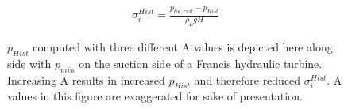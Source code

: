 \begin{eqnarray}
		\sigma_i^{Hist}=\frac{p_{tot,exit}-p_{Hist}}{\rho_{L}gH}
\label{Cavi7}
\end{eqnarray}


\begin{figure}[h!]
\begin{minipage}[b]{1\linewidth}
 \centering
\end{minipage}
\caption{$p_{Hist}$ computed with three different A values is depicted here along side with $p_{min}$ on the suction side of a Francis hydraulic turbine. Increasing A results in increased $p_{Hist}$ and therefore reduced $\sigma_i^{Hist}$. A values in this figure are exaggerated for sake of presentation.}
\label{design-cav-histo}
\end{figure}



